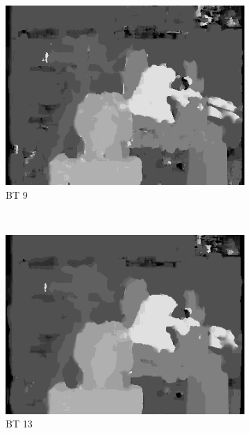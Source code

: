 \begin{figure}
  \begin{subfigure}[b]{0.23\textwidth}
    \centering
    \includegraphics[width=\textwidth]{images/stereo-pairs/tsukuba_bt_9.png}
    \caption{BT 9}
  \end{subfigure}
  ~
  \begin{subfigure}[b]{0.23\textwidth}
    \centering
    \includegraphics[width=\textwidth]{images/stereo-pairs/tsukuba_bt_13.png}
    \caption{BT 13}
  \end{subfigure}
  ~
  \begin{subfigure}[b]{0.23\textwidth}
    \centering

\end{subfigure}
\end{figure}
